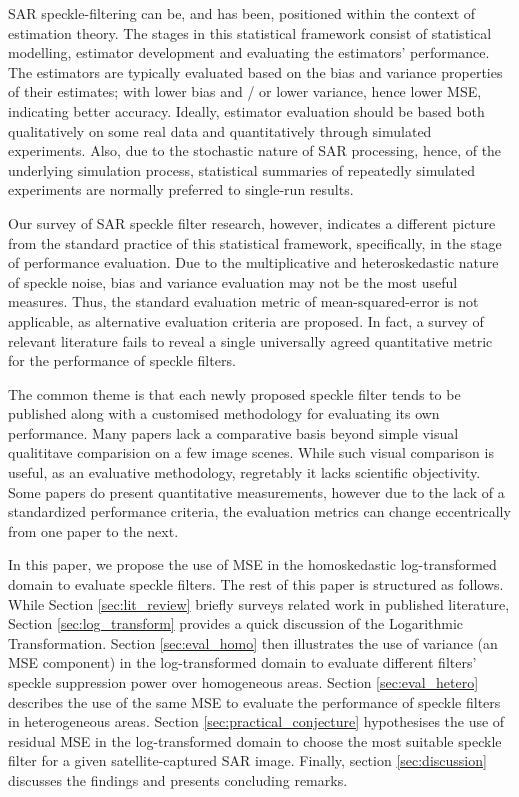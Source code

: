 \documentclass[journal]{IEEEtran}
\begin{document}
SAR speckle-filtering can be, and has been, positioned within the context of estimation theory\cite{Touzi_2002_TGRS}. 
The stages in this statistical framework consist of statistical modelling, estimator development and evaluating the estimators' performance. 
The estimators are typically evaluated based on the bias and variance properties of their estimates; 
	with lower bias and / or lower variance, hence lower MSE, indicating better accuracy.
Ideally, estimator evaluation should be based both qualitatively on some real data and quantitatively through simulated experiments. 
Also, due to the stochastic nature of SAR processing, hence, of the underlying simulation process, 
	statistical summaries of repeatedly simulated experiments are normally preferred to single-run results.

Our survey of SAR speckle filter research, however, indicates 
	a different picture from the standard practice of this statistical framework, 
	specifically, in the stage of performance evaluation. 
Due to the multiplicative and heteroskedastic nature of speckle noise, 
	bias and variance evaluation may not be the most useful measures. 
Thus, the standard evaluation metric of mean-squared-error is not applicable,
	as alternative evaluation criteria are proposed.
In fact, a survey of relevant literature fails to reveal 
	a single universally agreed quantitative metric for the performance of speckle filters.

The common theme is that each newly proposed speckle filter tends to be published along with a customised methodology for evaluating its own performance.
Many papers lack a comparative basis beyond simple visual qualititave comparision on a few image scenes. 
While such visual comparison is useful, as an evaluative methodology, regretably it lacks scientific objectivity. 
Some papers do present quantitative measurements, 
	however  due to the lack of a standardized performance criteria, 
	the evaluation metrics can change eccentrically from one paper to the next.

In this paper, we propose the use of MSE in the homoskedastic log-transformed domain to evaluate speckle filters. 
The rest of this paper is structured as follows.
While Section \ref{sec:lit_review} briefly surveys related work in published literature, Section \ref{sec:log_transform} provides a quick discussion of the Logarithmic Transformation.
Section \ref{sec:eval_homo} then illustrates the use of variance (an MSE component) in the log-transformed domain to evaluate different filters' speckle suppression power over homogeneous areas.
Section \ref{sec:eval_hetero} describes the use of the same MSE to evaluate the performance of speckle filters in heterogeneous areas.
Section \ref{sec:practical_conjecture} hypothesises the use of residual MSE in the log-transformed domain 
	to choose the most suitable speckle filter for a given satellite-captured SAR image.
Finally, section \ref{sec:discussion} discusses the findings and presents concluding remarks.
\end{document}
